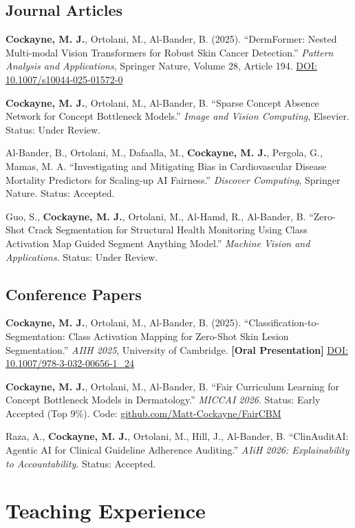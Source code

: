 \documentclass[10pt,a4paper]{article}
\begin{document}
\subsection{Journal Articles}
\textbf{Cockayne, M. J.}, Ortolani, M., Al-Bander, B. (2025). ``DermFormer: Nested Multi-modal Vision Transformers for Robust Skin Cancer Detection.'' \textit{Pattern Analysis and Applications}, Springer Nature, Volume 28, Article 194. \href{https://doi.org/10.1007/s10044-025-01572-0}{DOI: 10.1007/s10044-025-01572-0}

\textbf{Cockayne, M. J.}, Ortolani, M., Al-Bander, B. ``Sparse Concept Absence Network for Concept Bottleneck Models.'' \textit{Image and Vision Computing}, Elsevier. Status: Under Review.

Al-Bander, B., Ortolani, M., Dafaalla, M., \textbf{Cockayne, M. J.}, Pergola, G., Mamas, M. A. ``Investigating and Mitigating Bias in Cardiovascular Disease Mortality Predictors for Scaling-up AI Fairness.'' \textit{Discover Computing}, Springer Nature. Status: Accepted.

Guo, S., \textbf{Cockayne, M. J.}, Ortolani, M., Al-Hamd, R., Al-Bander, B. ``Zero-Shot Crack Segmentation for Structural Health Monitoring Using Class Activation Map Guided Segment Anything Model.'' \textit{Machine Vision and Applications}. Status: Under Review.

\subsection{Conference Papers}
\textbf{Cockayne, M. J.}, Ortolani, M., Al-Bander, B. (2025). ``Classification-to-Segmentation: Class Activation Mapping for Zero-Shot Skin Lesion Segmentation.'' \textit{AIIH 2025}, University of Cambridge. \textbf{[Oral Presentation]} \href{https://doi.org/10.1007/978-3-032-00656-1_24}{DOI: 10.1007/978-3-032-00656-1\_24}

\textbf{Cockayne, M. J.}, Ortolani, M., Al-Bander, B. ``Fair Curriculum Learning for Concept Bottleneck Models in Dermatology.'' \textit{MICCAI 2026}. Status: Early Accepted (Top 9\%). Code: \href{https://github.com/Matt-Cockayne/FairCBM}{github.com/Matt-Cockayne/FairCBM}

Raza, A., \textbf{Cockayne, M. J.}, Ortolani, M., Hill, J., Al-Bander, B. ``ClinAuditAI: Agentic AI for Clinical Guideline Adherence Auditing.'' \textit{AIiH 2026: Explainability to Accountability}. Status: Accepted.

\section{Teaching Experience}
\end{document}
